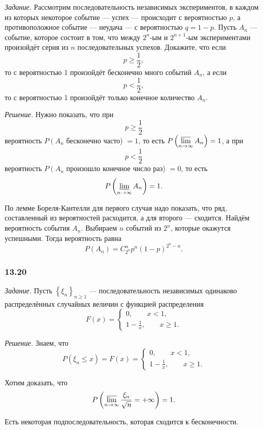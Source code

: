 \textit{Задание.}
Рассмотрим последовательность независимых экспериментов,
в каждом из которых некоторое событие --- успех --- происходит с вероятностью $p$, а противоположное событие --- неудача --- с вероятностью $q = 1 - p$.
Пусть $A_n$ --- событие, которое состоит в том, что между $2^n$-ым и $2^{n+1}$-ым экспериментами произойдёт серия из $n$ последовательных успехов.
Докажите, что если
$$p \geq \frac{1}{2},$$
то с вероятностью 1 произойдёт бесконечно много событий $A_n$, а если
$$p < \frac{1}{2},$$
то с вероятностью 1 произойдёт только конечное количество $A_n$.

\textit{Решение.} Нужно показать, что при
$$p \geq \frac{1}{2}$$
вероятность $P \left( A_n \right.$ бесконечно часто) $= 1$, то есть $P \left( \varlimsup \limits_{n \to \infty } A_n \right) = 1$, а при
$$p < \frac{1}{2}$$
вероятность $P \left( A_n \right.$ произошло конечное число раз) $= 0$, то есть
$$P \left( \varliminf \limits_{n \to \infty } A_n \right) = 1.$$

По лемме Бореля-Кантелли для первого случая надо показать, что ряд, составленный из вероятностей расходится, а для второго --- сходится.
Найдём вероятность события $A_n$.
Выбираем $n$ событий из $2^n$, которые окажутся успешными.
Тогда вероятность равна
$$P \left( A_n \right) =
C_{2^n}^n p^n \left( 1 - p \right)^{2^n-n}.$$

\subsubsection*{13.20}

\textit{Задание.} Пусть $ \left\{ \xi_n \right\}_{n \geq 1}$ --- последовательность независимых одинаково распределённых случайных величин с функцией распределения
$$F \left( x \right) =
\begin{cases}
0, \qquad x < 1, \\
1 - \frac{1}{x}, \qquad x \geq 1.
\end{cases}$$
 
\textit{Решение.} Знаем, что
$$P \left( \xi_n \leq x \right) =
F \left( x \right) =
\begin{cases}
0, \qquad x < 1, \\
1 - \frac{1}{x}, \qquad x \geq 1.
\end{cases}$$

Хотим доказать, что
$$P \left( \varlimsup \limits_{n \to \infty } \frac{ \xi_n}{ \sqrt{n}} =
+ \infty \right) =
1.$$

Есть некоторая подпоследовательность, которая сходится к бесконечности.

